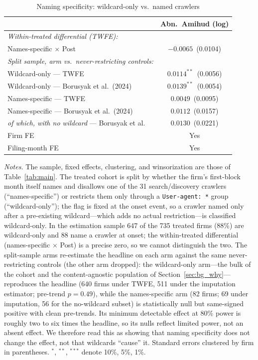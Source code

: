 \begin{table}[t]
\centering
\begin{threeparttable}
\caption{Naming specificity: wildcard-only vs.\ named crawlers}
\label{tab:anatomy}
\small
\begin{tabular}{lc}
\toprule
 & Abn.\ Amihud (log) \\
\midrule
\textit{Within-treated differential (TWFE):} & \\
\quad Names-specific $\times$ Post                 & $-0.0065$\ (0.0104) \\[2pt]
\textit{Split sample, arm vs.\ never-restricting controls:} & \\
\quad Wildcard-only --- TWFE                       & $0.0114^{**}$\ (0.0056) \\
\quad Wildcard-only --- Borusyak et al.\ (2024)    & $0.0139^{**}$\ (0.0054) \\
\quad Names-specific --- TWFE                      & $0.0049$\ (0.0095) \\
\quad Names-specific --- Borusyak et al.\ (2024)   & $0.0112$\ (0.0157) \\
\quad \quad \emph{of which, with no wildcard} --- Borusyak et al.\ & $0.0130$\ (0.0221) \\
\midrule
Firm FE          & Yes \\
Filing-month FE  & Yes \\
\bottomrule
\end{tabular}
\begin{tablenotes}\footnotesize
\item \textit{Notes.} The sample, fixed effects, clustering, and winsorization are those of Table~\ref{tab:main}. The treated cohort is split by whether the firm's first-block month itself names and disallows one of the 31 search/discovery crawlers (``names-specific'') or restricts them only through a \texttt{User-agent: *} group (``wildcard-only''); the flag is fixed at the onset event, so a crawler named only after a pre-existing wildcard---which adds no actual restriction---is classified wildcard-only. In the estimation sample 647 of the 735 treated firms (88\%) are wildcard-only and 88 name a crawler at onset; the within-treated differential (names-specific $\times$ Post) is a precise zero, so we cannot distinguish the two. The split-sample arms re-estimate the headline on each arm against the same never-restricting controls (the other arm dropped): the wildcard-only arm---the bulk of the cohort and the content-agnostic population of Section~\ref{sec:bg_why}---reproduces the headline (640 firms under TWFE, 511 under the imputation estimator; pre-trend $p=0.49$), while the names-specific arm (82 firms; 69 under imputation, 56 for the no-wildcard subset) is statistically null but same-signed positive with clean pre-trends. Its minimum detectable effect at 80\% power is roughly two to six times the headline, so its nulls reflect limited power, not an absent effect. We therefore read this as showing that naming specificity does not change the effect, not that wildcards ``cause'' it. Standard errors clustered by firm in parentheses. $^{*}$, $^{**}$, $^{***}$ denote 10\%, 5\%, 1\%.
\end{tablenotes}
\end{threeparttable}
\end{table}
